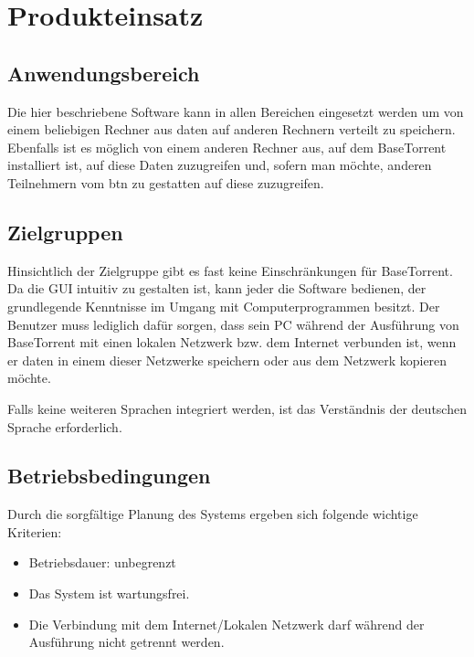\section{Produkteinsatz}
 \subsection{Anwendungsbereich}
    Die hier beschriebene Software kann in allen Bereichen eingesetzt werden um von einem 
    beliebigen Rechner aus \gls{daten} auf anderen Rechnern verteilt zu speichern. 
    Ebenfalls ist es möglich von einem anderen Rechner aus, auf dem BaseTorrent installiert ist,
    auf diese Daten zuzugreifen und, sofern man möchte, anderen Teilnehmern vom \gls{btn} zu gestatten auf diese zuzugreifen.


\subsection{Zielgruppen}
  Hinsichtlich der Zielgruppe gibt es fast keine Einschränkungen für BaseTorrent. 
  Da die GUI intuitiv zu gestalten ist, kann jeder die Software bedienen, der grundlegende 
  Kenntnisse im Umgang mit Computerprogrammen besitzt. 
  Der Benutzer muss lediglich dafür sorgen, dass sein PC während der Ausführung von BaseTorrent 
  mit einen lokalen Netzwerk bzw. dem Internet verbunden ist, wenn er \gls{daten} in einem 
  dieser Netzwerke speichern oder aus dem Netzwerk kopieren möchte. 

  Falls keine weiteren Sprachen integriert werden, ist das Verständnis der deutschen Sprache
  erforderlich.


 \subsection{Betriebsbedingungen}
  Durch die sorgfältige Planung des Systems ergeben sich folgende wichtige Kriterien:
  \begin{itemize}
    \item Betriebsdauer: unbegrenzt
    \item Das System ist wartungsfrei.
    \item Die Verbindung mit dem Internet/Lokalen Netzwerk darf während \-
    der Ausführung nicht getrennt werden.
\end{itemize}



 
 
